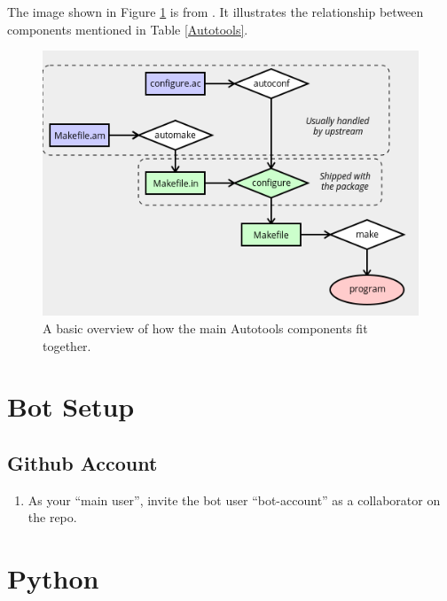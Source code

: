 \justifying
The image shown in Figure \ref{diagram} is from \cite{autobasics}.
It illustrates the relationship between components mentioned in Table \ref{Autotools}.
\vspace{2mm}

\begin{figure}[ht]
	\includegraphics[width=12cm]{images/diagram.png}
	\caption{A basic overview of how the main Autotools components fit together.}
	\label{diagram}
\end{figure}
\vspace{2mm}

\section{\label{sec:bot}Bot Setup}


\subsection{\label{sec:ghbot}Github Account}

\justifying
\begin{raggedright}
	\begin{enumerate}
		\item As your ``main user'', invite the bot user ``bot-account'' as a collaborator on the repo.
	\end{enumerate}
\end{raggedright}
\vspace{2mm}

\section{\label{sec:Python}Python}

